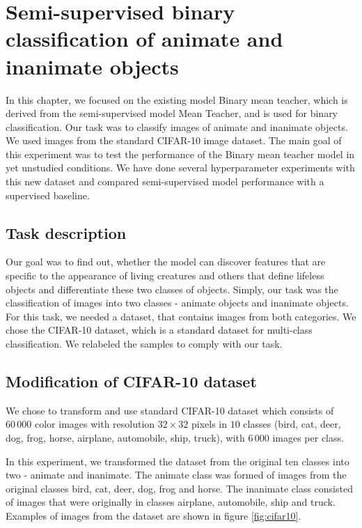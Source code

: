 \chapter[Semi-supervised binary classification]{Semi-supervised binary classification of animate and inanimate objects}
\label{chap:bmt-exp} %

In this chapter, we focused on the existing model Binary mean teacher, which is derived from the semi-supervised model Mean Teacher, and is used for binary classification. Our task was to classify images of animate and inanimate objects. We used images from the standard CIFAR-10 image dataset. The main goal of this experiment was to test the performance of the Binary mean teacher model in yet unstudied conditions. We have done several hyperparameter experiments with this new dataset and compared semi-supervised model performance with a supervised baseline.


\section{Task description}

Our goal was to find out, whether the model can discover features that are specific to the appearance of living creatures and others that define lifeless objects and differentiate these two classes of objects. Simply, our task was the classification of images into two classes - animate objects and inanimate objects. For this task, we needed a dataset, that contains images from both categories. We chose the CIFAR-10 dataset, which is a standard dataset for multi-class classification. We relabeled the samples to comply with our task.


\section{Modification of CIFAR-10 dataset}
\label{dataset-cifar10}

We chose to transform and use standard CIFAR-10 dataset \cite{krizhevsky2009} which consists of $60\,000$ color images with resolution $32 \times 32$ pixels in $10$ classes (bird, cat, deer, dog, frog, horse, airplane, automobile, ship, truck), with $6\,000$ images per class. 

In this experiment, we transformed the dataset from the original ten classes into two - animate and inanimate. The animate class was formed of images from the original classes bird, cat, deer, dog, frog and horse. The inanimate class consisted of images that were originally in classes airplane, automobile, ship and truck. Examples of images from the dataset are shown in figure \ref{fig:cifar10}.

